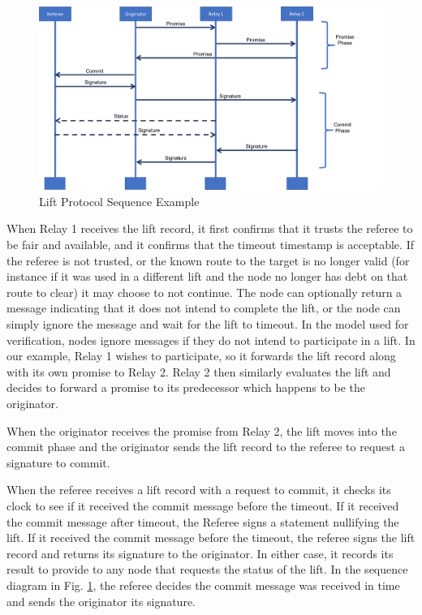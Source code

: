 \documentclass[runningheads]{llncs}
\begin{document}
\begin{figure}
    \centering
    \includegraphics[scale=0.45]{SequenceDiagramLifeline.png}
    \caption{Lift Protocol Sequence Example}
    \label{fig:liftSequence}
\end{figure}

When Relay 1 receives the lift record, it first confirms that it trusts the referee to be fair and available, and it confirms that the timeout timestamp is acceptable. If the referee is not trusted, or the known route to the target is no longer valid (for instance if it was used in a different lift and the node no longer has debt on that route to clear) it may choose to not continue. The node can optionally return a message indicating that it does not intend to complete the lift, or the node can simply ignore the message and wait for the lift to timeout. In the model used for verification, nodes ignore messages if they do not intend to participate in a lift. In our example, Relay 1 wishes to participate, so it forwards the lift record along with its own promise to Relay 2. Relay 2 then similarly evaluates the lift and decides to forward a promise to its predecessor which happens to be the originator. 

When the originator receives the promise from Relay 2, the lift moves into the commit phase and the originator sends the lift record to the referee to request a signature to commit. 

When the referee receives a lift record with a request to commit, it checks its clock to see if it received the commit message before the timeout. If it received the commit message after timeout, the Referee signs a statement nullifying the lift. If it received the commit message before the timeout, the referee signs the lift record and returns its signature to the originator. In either case, it records its result to provide to any node that requests the status of the lift. In the sequence diagram in Fig. \ref{fig:liftSequence}, the referee decides the commit message was received in time and sends the originator its signature.
\end{document}
